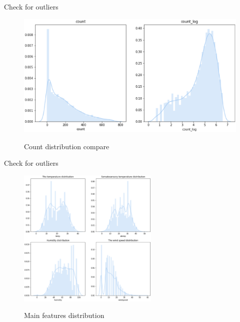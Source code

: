 \documentclass[
 size=14pt,
 paper=smartboard,  %
 mode=present, 		%
 display=slides, 	%
 style=tuliplab,  	%
 pauseslide,
 fleqn,leqno]{powerdot}
\begin{document}
\begin{slide}[toc=,bm=]{Check for outliers}


\begin{figure}
  \centering
  \includegraphics[width=1\textwidth]{figures//Count_distribution_compare.eps}\\
  \caption{Count distribution compare}\label{fig:OutAspect-target}
\end{figure}
  
  


\end{slide}
\begin{slide}[toc=,bm=]{Check for outliers}
\vspace{-0.8cm}
\begin{figure}
\centering
{}
\includegraphics[width=0.6\textwidth]{figures//Features_distribution_analysis.eps}\\
\caption{Main features distribution}\label{fig:OutAspect-target}
\end{figure}
      
\end{slide}
  
\end{document}
